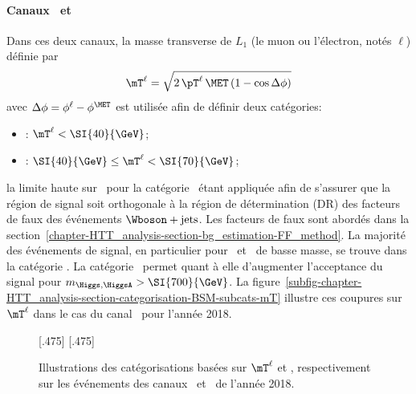 \paragraph{Canaux \mu\tauh\ et \ele\tauh}
Dans ces deux canaux, la masse transverse de $L_1$ (le muon ou l'électron, notés $\ell$) définie par
\begin{equation}
\mT^{\ell} = \sqrt{2 \, \pT^{\ell} \, \MET \, (1-\cos\Delta\phi)} \label{eq-mT_def-ell}
\end{equation}
avec $\Delta\phi = \phi^{\ell} - \phi^{\MET}$
est utilisée afin de définir deux catégories:
\begin{itemize}
\item \CATtightmt: $\mT^{\ell} < \SI{40}{\GeV}$;
\item \CATloosemt: $\SI{40}{\GeV} \leq \mT^{\ell} < \SI{70}{\GeV}$;
\end{itemize}
la limite haute sur \mT\ pour la catégorie \CATloosemt\ étant appliquée afin de s'assurer que la région de signal soit orthogonale à la région de détermination (DR) des facteurs de faux des événements $\Wboson+\text{jets}$.
Les facteurs de faux sont abordés dans la section~\ref{chapter-HTT_analysis-section-bg_estimation-FF_method}.
La majorité des événements de signal, en particulier pour \Higgs\ et \HiggsA\ de basse masse, se trouve dans la catégorie \CATtightmt.
La catégorie \CATloosemt\ permet quant à elle d'augmenter l'acceptance du signal pour $m_{\Higgs,\HiggsA} > \SI{700}{\GeV}$.
La figure~\ref{subfig-chapter-HTT_analysis-section-categorisation-BSM-subcats-mT} illustre ces coupures sur $\mT^{\ell}$ dans le cas du canal \ele\tauh\ pour l'année 2018.
\begin{figure}[h]
\centering

[.475\textwidth]
{}
\hfill
{}[.475\textwidth]
{}

\caption[Illustrations des catégorisations basées sur $\mT^{\ell}$ et \Dzeta]{Illustrations des catégorisations basées sur $\mT^{\ell}$ et \Dzeta, respectivement sur les événements des canaux \ele\tauh\ et \ele\mu\ de l'année 2018.}
\label{fig-chapter-HTT_analysis-section-categorisation-BSM-subcats}
\end{figure}
